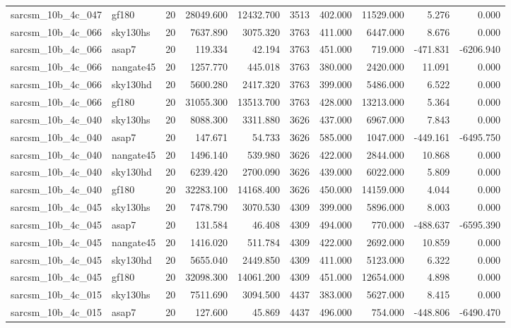 \begin{tabular}{llrrrrrrrr}
sarcsm\_10b\_4c\_047 & gf180 & 20 & 28049.600 & 12432.700 & 3513 & 402.000 & 11529.000 & 5.276 & 0.000 \\
sarcsm\_10b\_4c\_066 & sky130hs & 20 & 7637.890 & 3075.320 & 3763 & 411.000 & 6447.000 & 8.676 & 0.000 \\
sarcsm\_10b\_4c\_066 & asap7 & 20 & 119.334 & 42.194 & 3763 & 451.000 & 719.000 & -471.831 & -6206.940 \\
sarcsm\_10b\_4c\_066 & nangate45 & 20 & 1257.770 & 445.018 & 3763 & 380.000 & 2420.000 & 11.091 & 0.000 \\
sarcsm\_10b\_4c\_066 & sky130hd & 20 & 5600.280 & 2417.320 & 3763 & 399.000 & 5486.000 & 6.522 & 0.000 \\
sarcsm\_10b\_4c\_066 & gf180 & 20 & 31055.300 & 13513.700 & 3763 & 428.000 & 13213.000 & 5.364 & 0.000 \\
sarcsm\_10b\_4c\_040 & sky130hs & 20 & 8088.300 & 3311.880 & 3626 & 437.000 & 6967.000 & 7.843 & 0.000 \\
sarcsm\_10b\_4c\_040 & asap7 & 20 & 147.671 & 54.733 & 3626 & 585.000 & 1047.000 & -449.161 & -6495.750 \\
sarcsm\_10b\_4c\_040 & nangate45 & 20 & 1496.140 & 539.980 & 3626 & 422.000 & 2844.000 & 10.868 & 0.000 \\
sarcsm\_10b\_4c\_040 & sky130hd & 20 & 6239.420 & 2700.090 & 3626 & 439.000 & 6022.000 & 5.809 & 0.000 \\
sarcsm\_10b\_4c\_040 & gf180 & 20 & 32283.100 & 14168.400 & 3626 & 450.000 & 14159.000 & 4.044 & 0.000 \\
sarcsm\_10b\_4c\_045 & sky130hs & 20 & 7478.790 & 3070.530 & 4309 & 399.000 & 5896.000 & 8.003 & 0.000 \\
sarcsm\_10b\_4c\_045 & asap7 & 20 & 131.584 & 46.408 & 4309 & 494.000 & 770.000 & -488.637 & -6595.390 \\
sarcsm\_10b\_4c\_045 & nangate45 & 20 & 1416.020 & 511.784 & 4309 & 422.000 & 2692.000 & 10.859 & 0.000 \\
sarcsm\_10b\_4c\_045 & sky130hd & 20 & 5655.040 & 2449.850 & 4309 & 411.000 & 5123.000 & 6.322 & 0.000 \\
sarcsm\_10b\_4c\_045 & gf180 & 20 & 32098.300 & 14061.200 & 4309 & 451.000 & 12654.000 & 4.898 & 0.000 \\
sarcsm\_10b\_4c\_015 & sky130hs & 20 & 7511.690 & 3094.500 & 4437 & 383.000 & 5627.000 & 8.415 & 0.000 \\
sarcsm\_10b\_4c\_015 & asap7 & 20 & 127.600 & 45.869 & 4437 & 496.000 & 754.000 & -448.806 & -6490.470 \\

\end{tabular}
